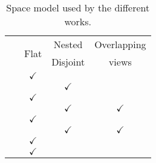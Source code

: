 \begin{table}[htbp]
  \caption{Space model used by the different works.}
  \centering
  \begin{tabular}{ l c c c }
    \hline 
    ~ & \multirow{2}{*}{Flat}  & Nested & Overlapping \\
    ~ & ~  & Disjoint  & views \\
    \hline 
    \midtsc{} & $\checkmark$ & & \\ %
    \midsws{} & & $\checkmark$ & \\
    \midstuples{} & $\checkmark$ & & \\
    \midcspaces{} & & $\checkmark$ & $\checkmark$ \\ %
    \midtscpp{} & $\checkmark$ & & \\
    \midtripcom{} & & $\checkmark$ & $\checkmark$ \\
    \midsmartmt{} & $\checkmark$ & & \\
    \midnardini{} & $\checkmark$ & & \\
    \hline 
  \end{tabular}
  \label{tab:space_comparison}
\end{table}